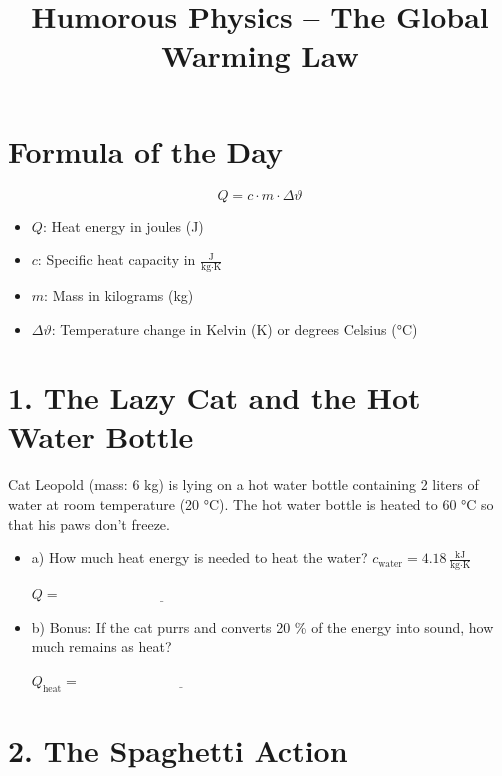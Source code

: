 \documentclass[a4paper]{article}
\begin{document}
	
	\title{Humorous Physics – The Global Warming Law}
	
	\section*{Formula of the Day}
	
	\[
	Q = c \cdot m \cdot \Delta \vartheta
	\]
	
	\begin{itemize}
		\item \( Q \): Heat energy in joules (J)
		\item \( c \): Specific heat capacity in \( \frac{\text{J}}{\text{kg} \cdot \text{K}} \)
		\item \( m \): Mass in kilograms (kg)
		\item \( \Delta \vartheta \): Temperature change in Kelvin (K) or degrees Celsius (°C)
	\end{itemize}
	
	\hrulefill
	
	\section*{1. The Lazy Cat and the Hot Water Bottle}
	
	Cat Leopold (mass: 6 kg) is lying on a hot water bottle containing 2 liters of water at room temperature (20 °C). The hot water bottle is heated to 60 °C so that his paws don't freeze.
	
	\begin{itemize}
		\item a) How much heat energy is needed to heat the water?
		\( c_\text{water} = 4{.}18\,\frac{\text{kJ}}{\text{kg}\cdot\text{K}} \)
		
		\vspace{1em}
		\( Q = \underline{\hspace{6cm}} \)
		
		\item b) Bonus: If the cat purrs and converts 20 \% of the energy into sound, how much remains as heat?
		
		\vspace{1em}
		\( Q_\text{heat} = \underline{\hspace{6cm}} \)
	\end{itemize}
	
	\hrulefill
	
	\section*{2. The Spaghetti Action }
	
\end{document}
